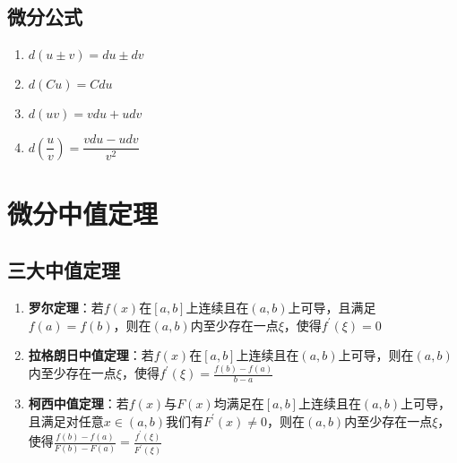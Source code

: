 \documentclass[12pt,a4paper,UTF8]{book}
\begin{document}
\subsection{微分公式}
\begin{enumerate}
\item $d\left(u\pm v\right)=du\pm dv$
\item $d\left(Cu\right)=Cdu$
\item $d\left(uv\right)=vdu+udv$
\item $d\left(\dfrac{u}{v}\right)=\dfrac{vdu-udv}{v^2}$
\end{enumerate}


\section{微分中值定理}
\subsection{三大中值定理}
\begin{enumerate}
\item \textbf{罗尔定理}：若$f\left(x\right)$在$\left[a,b\right]$上连续且在$\left(a,b\right)$上可导，且满足$f\left(a\right)=f\left(b\right)$，则在$\left(a,b\right)$内至少存在一点$\xi$，使得$f^\prime\left(\xi\right)=0$
\item \textbf{拉格朗日中值定理}：若$f\left(x\right)$在$\left[a,b\right]$上连续且在$\left(a,b\right)$上可导，则在$\left(a,b\right)$内至少存在一点$\xi$，使得$f^\prime\left(\xi\right)=\frac{f\left(b\right)-f\left(a\right)}{b-a}$
\item \textbf{柯西中值定理}：若$f\left(x\right)$与$F\left(x\right)$均满足在$\left[a,b\right]$上连续且在$\left(a,b\right)$上可导，且满足对任意$x\in\left(a,b\right)$我们有$F^\prime\left(x\right)\neq0$，则在$\left(a,b\right)$内至少存在一点$\xi$，使得$\frac{f\left(b\right)-f\left(a\right)}{F\left(b\right)-F\left(a\right)}=\frac{f^\prime\left(\xi\right)}{F^\prime\left(\xi\right)}$
\end{enumerate}
\end{document}
